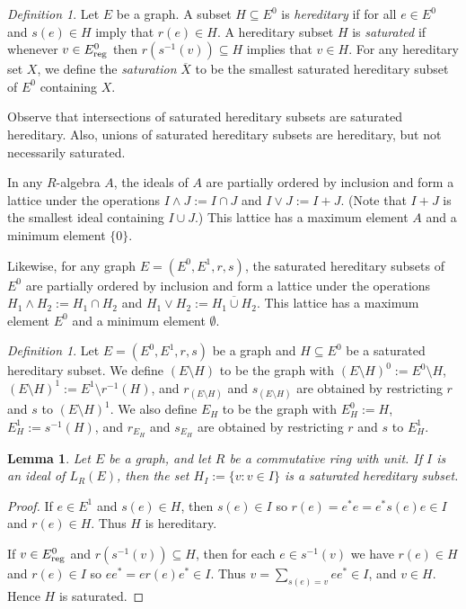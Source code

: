 \documentclass[11pt]{amsart}
\newtheorem{lemma}[theorem]{Lemma}
\theoremstyle{remark}
\newtheorem{definition}[theorem]{Definition}
\numberwithin{equation}{section}
\begin{document}
\begin{definition}
Let $E$ be a graph.  A subset $H \subseteq E^0$ is \emph{hereditary} if for all $e \in E^0$ and $s(e) \in H$ imply that $r(e) \in H$.  A hereditary subset $H$ is \emph{saturated} if whenever $v \in E^0_\textnormal{reg}$ then $r(s^{-1}(v)) \subseteq H$ implies that $v \in H$.  For any hereditary set $X$, we define the \emph{saturation} $\overline{X}$ to be the smallest saturated hereditary subset of $E^0$ containing $X$.
\end{definition}

Observe that intersections of saturated hereditary subsets are saturated hereditary.  Also, unions of saturated hereditary subsets are hereditary, but not necessarily saturated.

In any $R$-algebra $A$, the ideals of $A$ are partially ordered by inclusion and form a lattice under the operations $I \wedge J := I \cap J$ and $I \vee J := I + J$.  (Note that $I + J$ is the smallest ideal containing $I \cup J$.)  This lattice has a maximum element $A$ and a minimum element $\{ 0 \}$.

Likewise, for any graph $E=(E^0,E^1,r,s)$, the saturated hereditary subsets of $E^0$ are partially ordered by inclusion and form a lattice under the operations $H_1 \wedge H_2 := H_1 \cap H_2$ and $H_1 \vee H_2 := \overline{H_1 \cup H_2}$.  This lattice has a maximum element $E^0$ and a minimum element $\emptyset$.


\begin{definition} \label{graph-constructions}
Let $E = (E^0, E^1, r, s)$ be a graph and $H \subseteq E^0$ be a saturated hereditary subset.  We define $(E \setminus H)$ to be the graph with $(E \setminus H)^0 := E^0 \setminus H$,  $(E \setminus H)^1 := E^1 \setminus r^{-1}(H)$, and $r_{(E \setminus H)}$ and $s_{(E \setminus H)}$ are obtained by restricting $r$ and $s$ to $(E \setminus H)^1$.  We also define $E_H$ to be the graph with $E_H^0 := H$, $E_H^1 := s^{-1}(H)$, and $r_{E_H}$ and $s_{E_H}$ are obtained by restricting $r$ and $s$ to $E_H^1$. 
\end{definition}

\begin{lemma} \label{H-I-sat-hered}
Let $E$ be a graph, and let $R$ be a commutative ring with unit.  If $I$ is an ideal of $L_R(E)$, then the set $H_I := \{ v : v \in I \}$ is a saturated hereditary subset.
\end{lemma}

\begin{proof}
If $e \in E^1$ and $s(e) \in H$, then $s(e) \in I$ so $r(e) = e^*e = e^*s(e)e \in I$ and $r(e) \in H$.  Thus $H$ is hereditary.  

If $v \in E^0_\textnormal{reg}$ and $r(s^{-1}(v)) \subseteq H$, then for each $e \in s^{-1}(v)$ we have $r(e) \in H$ and $r(e) \in I$ so $ee^* = er(e)e^* \in I$.  Thus $v = \sum_{s(e) = v} ee^* \in I$, and $v \in H$.  Hence $H$ is saturated.
\end{proof}
\end{document}
